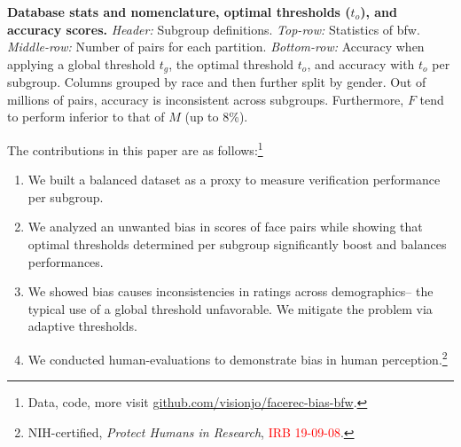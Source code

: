\begin{table}[!t]
    \centering
    \caption{\small{\textbf{Database stats and nomenclature, optimal thresholds ($t_o$), and accuracy scores.} \textit{Header:} Subgroup definitions. \textit{Top-row:} Statistics of \gls{bfw}. \textit{Middle-row:} Number of pairs for each partition. \textit{Bottom-row:} Accuracy when applying a global threshold $t_g$, the optimal threshold $t_o$, and accuracy with $t_o$ per subgroup. Columns grouped by race and then further split by gender. Out of millions of pairs, accuracy is inconsistent across subgroups. Furthermore, $F$ tend to perform inferior to that of $M$ (\ie up to 8\%).}}\label{tab:ethnic-splits}
    

\end{table}




The contributions in this paper are as follows:\footnote{Data, code, more visit \href{https://github.com/visionjo/facerec-bias-bfw}{github.com/visionjo/facerec-bias-bfw}.}
\begin{enumerate}
    \item We built a balanced dataset as a proxy to measure verification performance per subgroup.
    \item We analyzed an unwanted bias in scores of face pairs while showing that optimal thresholds determined per subgroup significantly boost and balances performances.
    \item We showed bias causes inconsistencies in ratings across demographics-- the typical use of a global threshold unfavorable. We mitigate the problem via adaptive thresholds.
    \item We conducted human-evaluations to demonstrate bias in human perception.\footnote{NIH-certified, \textit{Protect Humans in Research}, \textcolor{red}{IRB 19-09-08}.}
\end{enumerate}

